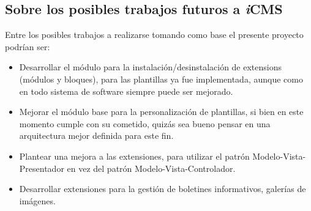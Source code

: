 \subsection{Sobre los posibles trabajos futuros a \textit{i}CMS}
Entre los posibles trabajos a realizarse tomando como base el presente proyecto podr\'ian ser:
\begin{itemize}
\item Desarrollar el m\'odulo para la instalaci\'on/desinstalaci\'on de extensions (m\'odulos y bloques), para las plantillas ya fue implementada, aunque como en todo sistema de software siempre puede ser mejorado.
\item Mejorar el m\'odulo base para la personalizaci\'on de plantillas, si bien en este momento cumple con su cometido, quiz\'as sea bueno pensar en una arquitectura mejor definida para este fin.
\item Plantear una mejora a las extensiones, para utilizar el patr\'on Modelo-Vista-Presentador en vez del patr\'on Modelo-Vista-Controlador.
\item Desarrollar extensiones para la gesti\'on de boletines informativos, galer\'ias de im\'agenes.
\end{itemize}

\clearpage
